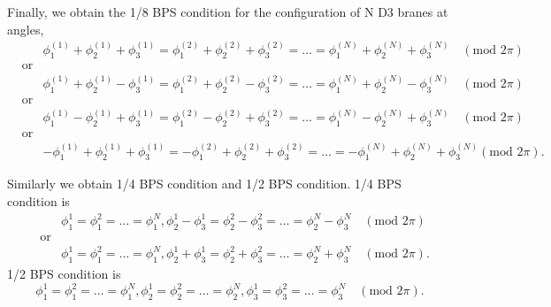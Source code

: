 \documentclass[a4paper,12pt]{article}
\begin{document}
\hspace{30mm}
  
Finally, we obtain the 1/8 BPS condition for the configuration of N D3 branes at angles,
\begin{eqnarray}
& &\phi^{(1)}_1+\phi^{(1)}_2+\phi^{(1)}_3 = \phi^{(2)}_1+\phi^{(2)}_2+\phi^{(2)}_3 = \ldots = \phi^{(N)}_1+\phi^{(N)}_2+\phi^{(N)}_3 \quad (\mbox{mod 2} \pi) \label{eq:1/8bps1} \\
&\mbox{or}& \nonumber \\
& &\phi^{(1)}_1+\phi^{(1)}_2-\phi^{(1)}_3 = \phi^{(2)}_1+\phi^{(2)}_2-\phi^{(2)}_3 = \ldots = \phi^{(N)}_1+\phi^{(N)}_2-\phi^{(N)}_3 \quad (\mbox{mod 2} \pi) \label{eq:1/8bps2} \\
&\mbox{or}& \nonumber \\
& &\phi^{(1)}_1-\phi^{(1)}_2+\phi^{(1)}_3 = \phi^{(2)}_1-\phi^{(2)}_2+\phi^{(2)}_3 = \ldots = \phi^{(N)}_1-\phi^{(N)}_2+\phi^{(N)}_3 \quad (\mbox{mod 2} \pi) \label{eq:1/8bps3}  \\
&\mbox{or}& \nonumber \\
& &-\phi^{(1)}_1+\phi^{(1)}_2+\phi^{(1)}_3 = -\phi^{(2)}_1+\phi^{(2)}_2+\phi^{(2)}_3 = \ldots = -\phi^{(N)}_1+\phi^{(N)}_2+\phi^{(N)}_3 (\mbox{mod 2} \pi). \label{eq:1/8bps4} 
\end{eqnarray}

Similarly we obtain 1/4 BPS condition and 1/2 BPS condition. 1/4 BPS condition is
\begin{eqnarray}
& &\phi_1^1=\phi_1^2=\ldots=\phi_1^N, \phi_2^1-\phi_3^1=\phi_2^2-\phi_3^2=\ldots = \phi_2^N-\phi_3^N \quad (\mbox{mod 2} \pi) \label{eq:1/4bps1} \\
&\mbox{or}& \nonumber \\
& &\phi_1^1=\phi_1^2=\ldots=\phi_1^N, \phi_2^1+\phi_3^1=\phi_2^2+\phi_3^2=\ldots = \phi_2^N+\phi_3^N \quad (\mbox{mod 2} \pi). \label{eq:1/4bps2}
\end{eqnarray}
1/2 BPS condition is
\begin{equation}
\phi_1^1=\phi_1^2=\ldots=\phi_1^N,\phi_2^1=\phi_2^2=\ldots=\phi_2^N,\phi_3^1=\phi_3^2=\ldots=\phi_3^N \quad (\mbox{mod 2} \pi). \label{eq:1/2bps}
\end{equation} 
\end{document}
